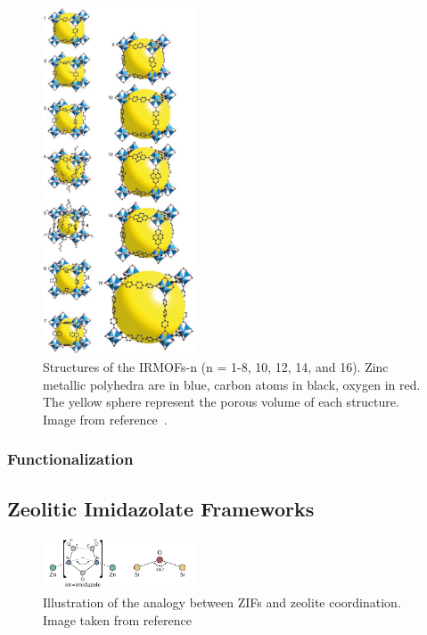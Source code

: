 \documentclass[thesis]{subfiles}
\begin{document}
\begin{figure}[htp]
    \centering
    \includegraphics[width=0.4\textwidth]{figures/images/irmof-all-sizes}
    \caption{Structures of the IRMOFs-n (n = 1-8, 10, 12, 14, and 16). Zinc
    metallic polyhedra are in blue, carbon atoms in black, oxygen in red. The
    yellow sphere represent the porous volume of each structure. Image from
    reference~\cite{Eddaoudi2002}.}
    \label{fig:irmof-all-sizes}
\end{figure}

\subsubsection{Functionalization}

\subsection{Zeolitic Imidazolate Frameworks}

\begin{figure}[ht]
    \centering
    \includegraphics[width=0.4\textwidth]{figures/images/zeolite-to-zif}
    \caption{Illustration of the analogy between ZIFs and zeolite coordination.
    Image taken from reference~\cite{Bennett2010}}
    \label{fig:zeolite-to-zif}
\end{figure}
\end{document}
